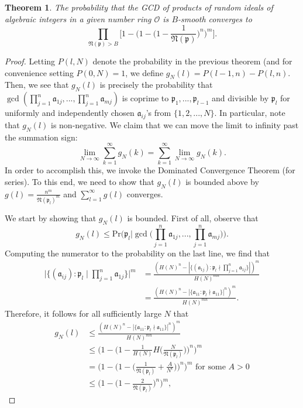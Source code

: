 \documentclass[12pt]{amsart}
\newtheorem{theorem}{Theorem}[subsection]
\theoremstyle{definition}
\newcommand{\f}[1]{\mathfrak{#1}}
\begin{document}
\begin{theorem}
	The probability that the GCD of products of random ideals of algebraic integers in a given number ring $\mathcal{O}$ is $B$-smooth converges to
	$$\prod_{\f{N}(\f{p})>B}\Big[1 - \Big(1 - \Big(1 - \frac{1}{\f{N}(\f{p})}\Big)^n \Big)^m \Big].$$
\end{theorem}

\begin{proof}
	Letting $P(l, N)$ denote the probability in the previous theorem (and for convenience setting $P(0, N) = 1$, we define $g_N(l) = P(l-1, n) - P(l, n)$. Then, we see that $g_N(l)$ is precisely the probability that $\gcd(\prod_{j=1}^n \mathfrak{a}_{1j}, ... , \prod_{j=1}^n \mathfrak{a}_{mj})$ is coprime to $\mathfrak{p}_1, ..., \mathfrak{p}_{l-1}$ and divisible by $\mathfrak{p}_l$ for uniformly and independently chosen $\mathfrak{a}_{ij}$'s from $\{1, 2, ..., N\}$. In particular, note that $g_N(l)$ is non-negative. We claim that we can move the limit to infinity past the summation sign:
	$$\lim_{N \to \infty} \sum_{k=1}^{\infty} g_N(k) = \sum_{k=1}^{\infty} \lim_{N \to \infty} g_N(k).$$
	In order to accomplish this, we invoke the Dominated Convergence Theorem (for series). To this end, we need to show that $g_N(l)$ is bounded above by $g(l) = \frac{n^m}{\mathfrak{N}(\mathfrak{p}_l)^m}$ and $\sum_{l=1}^{\infty} g(l)$ converges.
	
	We start by showing that $g_N(l)$ is bounded. First of all, observe that
	$$g_N(l) \leq \text{Pr}\Big(\mathfrak{p}_l \Big| \gcd\Big(\prod_{j=1}^n \mathfrak{a}_{1j}, ... , \prod_{j=1}^n \mathfrak{a}_{mj}\Big)\Big).$$
	Computing the numerator to the probability on the last line, we find that
	\begin{align*} 
		\Big|\{(\f{a}_{ij}) : \mathfrak{p}_l \mid \prod_{j=1}^n \mathfrak{a}_{1j}\}\Big|^m &= \frac{(H(N)^n - |\{(\mathfrak{a}_{1j}) : \mathfrak{p}_l \nmid \prod_{j=1}^n \mathfrak{a}_{1j}\}|)^m}{H(N)^{mn}}\\ &= \frac{(H(N)^n - |\{\f{a}_{11} : \mathfrak{p}_l \nmid \mathfrak{a}_{11}\}|^n)^m}{H(N)^{mn}}. \end{align*}
	Therefore, it follows for all sufficiently large $N$ that
	\begin{align*} 
		g_N(l) &\leq \frac{(H(N)^n - |\{\f{a}_{11} : \mathfrak{p}_l \nmid \mathfrak{a}_{11}\}|^n)^m}{H(N)^{mn}}\\ &\leq \Big(1 - \Big(1 - \frac{1}{H(N)} H\Big(\frac{N}{\f{N}(\f{p}_l)}\Big)\Big)^n\Big)^m\\
		&= \Big(1- \Big(1 - \Big(\frac{1}{\mathfrak{N}(\mathfrak{p}_l)} + \frac{A}{N^{\epsilon}}\Big)\Big)^n \Big)^m \text{ for some } A > 0\\ &\leq \Big(1- \Big(1 - \frac{2}{\mathfrak{N}(\mathfrak{p}_l)}\Big)^n \Big)^m, \end{align*}
	

\end{proof}
\end{document}
